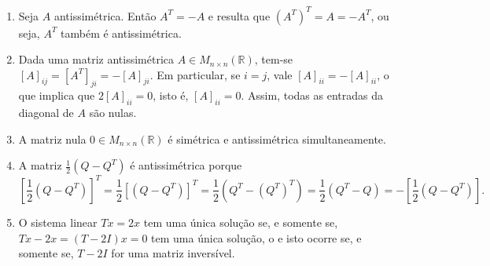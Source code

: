 \documentclass[12pt,a4paper]{article}
\newcommand*\R{\mathbb{R}}
\begin{document}
\begin{enumerate}
\begin{enumerate}
\item Seja $A$ antissimétrica. Então $A^T = -A$ e resulta que $
\left( A^T \right)^T = A = -A^T$, ou seja, $A^T$ também é antissimétrica.

\item Dada uma matriz antissimétrica $A \in M_{n \times n}(\R)$, tem-se $[A]_{ij} = [A^T]_{ji} = -[A]_{ji}$. Em particular, se $i = j$, vale $[A]_{ii} = -[A]_{ii}$, o que implica que  $2[A]_{ii} = 0$, isto é,  $[A]_{ii} = 0$. Assim, todas as entradas da diagonal de $A$ são nulas.

\item A matriz nula $0 \in M_{n \times n}(\R)$ é simétrica e antissimétrica simultaneamente.

\item A matriz $\frac{1}{2}(Q-Q^T)$ é antissimétrica porque
{\footnotesize
\[
\left[ \frac{1}{2}(Q-Q^T) \right]^T
= \frac{1}{2} \left[ (Q-Q^T) \right]^T
= \frac{1}{2} (Q^T-(Q^T)^T)
= \frac{1}{2} (Q^T-Q)
= - \left[ \frac{1}{2} (Q - Q^T)\right].
\]
}

\item O sistema linear $Tx = 2x$ tem uma única solução se, e somente se, $Tx - 2x = (T - 2I)x = 0$ tem uma única solução, o e isto ocorre se, e somente se, $T-2I$ for uma matriz inversível.
\end{enumerate}



\end{enumerate}
\end{document}
